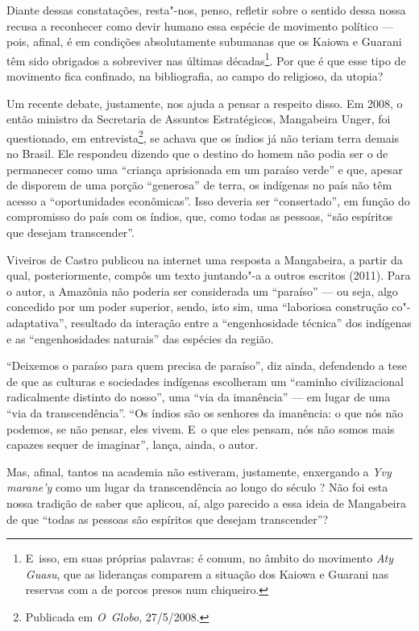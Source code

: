 Diante dessas constatações, resta"-nos, penso, refletir sobre o sentido
dessa nossa recusa a reconhecer como devir humano essa espécie de
movimento político --- pois, afinal, é em condições absolutamente
subumanas que os Kaiowa e Guarani têm sido obrigados a sobreviver nas
últimas décadas\footnote{E~isso, em suas próprias palavras: é comum, no
âmbito do movimento \emph{Aty Guasu}, que as lideranças comparem a situação
dos Kaiowa e Guarani nas reservas com a de porcos presos num
chiqueiro.}. Por que é que esse tipo de movimento fica confinado, na
bibliografia, ao campo do religioso, da utopia?

Um recente debate, justamente, nos ajuda a pensar a respeito disso. Em
2008, o então ministro da Secretaria de Assuntos Estratégicos,
Mangabeira Unger, foi questionado, em entrevista\footnote{Publicada em
\emph{O~Globo}, 27/5/2008.}, se achava que os índios já não teriam terra
demais no Brasil. Ele respondeu dizendo que o destino do homem não
podia ser o de permanecer como uma ``criança aprisionada em um paraíso
verde'' e que, apesar de disporem de uma porção ``generosa'' de terra, os
indígenas no país não têm acesso a ``oportunidades econômicas''. Isso
deveria ser ``consertado'', em função do compromisso do país com os
índios, que, como todas as pessoas, ``são espíritos que desejam
transcender''.

Viveiros de Castro publicou na internet uma resposta a Mangabeira, a
partir da qual, posteriormente, compôs um texto juntando"-a a outros
escritos (2011). Para o autor, a Amazônia não poderia ser considerada
um ``paraíso'' --- ou seja, algo concedido por um poder superior, sendo,
isto sim, uma ``laboriosa construção co"-adaptativa'', resultado da
interação entre a ``engenhosidade técnica'' dos indígenas e as
``engenhosidades naturais'' das espécies da região. 

``Deixemos o paraíso para quem precisa de paraíso'', diz ainda, defendendo
a tese de que as culturas e sociedades indígenas escolheram um ``caminho
civilizacional radicalmente distinto do nosso'', uma ``via da imanência''
--- em lugar de uma ``via da transcendência''. ``Os índios são os senhores
da imanência: o que nós não podemos, se não pensar, eles vivem. E~o que
eles pensam, nós não somos mais capazes sequer de imaginar'', lança,
ainda, o autor.

Mas, afinal, tantos na academia não estiveram, justamente, enxergando a
\emph{Yvy marane’y} como um lugar da transcendência ao longo do século ? Não
foi esta nossa tradição de saber que aplicou, aí, algo parecido a essa
ideia de Mangabeira de que ``todas as pessoas são espíritos que desejam
transcender''?

